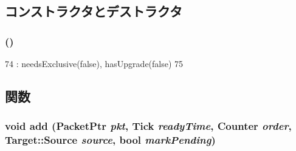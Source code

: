 \subsection{コンストラクタとデストラクタ}
\hypertarget{classMSHR_1_1TargetList_aa447a12890c20f5852e14342c550a18d}{
\subsubsection[{TargetList}]{ ()}}
\label{classMSHR_1_1TargetList_aa447a12890c20f5852e14342c550a18d}



\begin{DoxyCode}
74     : needsExclusive(false), hasUpgrade(false)
75 {}
\end{DoxyCode}


\subsection{関数}
\hypertarget{classMSHR_1_1TargetList_af6d681685dd55314bc183bd3305b2a52}{
\subsubsection[{add}]{\setlength{\rightskip}{0pt plus 5cm}void add ({\bf PacketPtr} {\em pkt}, \/  {\bf Tick} {\em readyTime}, \/  {\bf Counter} {\em order}, \/  {\bf Target::Source} {\em source}, \/  bool {\em markPending})}}
\label{classMSHR_1_1TargetList_af6d681685dd55314bc183bd3305b2a52}



